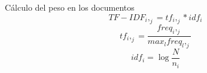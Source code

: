 \documentclass{beamer}
\begin{document}
\begin{frame}{Cálculo del peso en los documentos}
    \begin{equation}
        TF-IDF_i,_j = tf_i,_j * idf_i
    \end{equation}
    \begin{equation}
        tf_i,_j = \frac{freq_i,_j}{max_l freq_l,_j}
    \end{equation}
    \begin{equation}
        idf_i = \log \frac{N}{n_i}
    \end{equation}
    
\end{frame}



  
\end{document}
